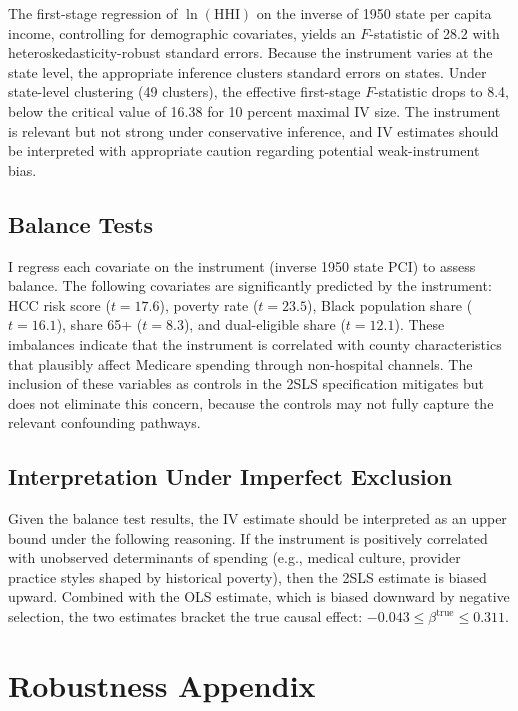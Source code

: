 \documentclass[12pt]{article}
\begin{document}
The first-stage regression of $\ln(\text{HHI})$ on the inverse of 1950 state per capita income, controlling for demographic covariates, yields an $F$-statistic of 28.2 with heteroskedasticity-robust standard errors. Because the instrument varies at the state level, the appropriate inference clusters standard errors on states. Under state-level clustering (49 clusters), the effective first-stage $F$-statistic drops to 8.4, below the \citet{stock2005testing} critical value of 16.38 for 10 percent maximal IV size. The instrument is relevant but not strong under conservative inference, and IV estimates should be interpreted with appropriate caution regarding potential weak-instrument bias.

\subsection{Balance Tests}

I regress each covariate on the instrument (inverse 1950 state PCI) to assess balance. The following covariates are significantly predicted by the instrument: HCC risk score ($t = 17.6$), poverty rate ($t = 23.5$), Black population share ($t = 16.1$), share 65+ ($t = 8.3$), and dual-eligible share ($t = 12.1$). These imbalances indicate that the instrument is correlated with county characteristics that plausibly affect Medicare spending through non-hospital channels. The inclusion of these variables as controls in the 2SLS specification mitigates but does not eliminate this concern, because the controls may not fully capture the relevant confounding pathways.

\subsection{Interpretation Under Imperfect Exclusion}

Given the balance test results, the IV estimate should be interpreted as an upper bound under the following reasoning. If the instrument is positively correlated with unobserved determinants of spending (e.g., medical culture, provider practice styles shaped by historical poverty), then the 2SLS estimate is biased upward. Combined with the OLS estimate, which is biased downward by negative selection, the two estimates bracket the true causal effect: $-0.043 \leq \beta^{\text{true}} \leq 0.311$.

\section{Robustness Appendix}
\label{app:robustness}
\end{document}
